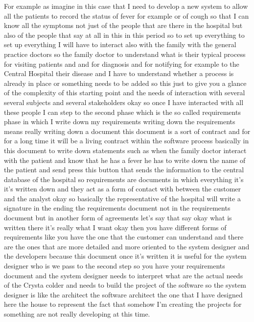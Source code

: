 \documentclass[conference, compsoc, twoside]{IEEEtran}
\begin{document}
For example as imagine in this case that I need to develop a new system to allow all the patients to record the status of fever 
for example or of cough so that I can know all the symptoms not just of the people that are there in the hospital but also of the people that say at all in this in this period so to set up everything to set up everything I will have to interact also with the family with the general practice doctors so the family doctor to understand what is their typical process for visiting patients and and for diagnosis and for notifying 
for example to the Central Hospital their disease and I have to understand whether a process is already in place or something needs to be added so this just to give you a glance of the complexity of this starting point and the needs of interaction with several several subjects and several stakeholders okay so once I have interacted with all these people I can step to the second phase which is the so called requirements phase in which I write down my requirements writing down the requirements means really writing down a document this document is a sort of contract and for for a long time it will be a living contract within the software process basically in this document to write down statements such as when the family doctor interact with the patient and know that he has a fever he has to write down the name of the patient and send press this button that sends the information to the central database of the hospital so requirements are documents in which everything it's it's written down and they act as a form of contact with between the customer and the analyst okay so basically the representative of the hospital will write a signature in the ending the requirements document not in the requirements document but in another form of agreements let's say that say okay what is written there it's really what I want okay then you have different forms of requirements like you have the one that the customer can understand and there are the ones that are more detailed and more oriented to the system designer and the developers because this document once it's written it is useful for the system designer who is we pass to the second step so you have your requirements document and the system designer needs to interpret what are the actual needs of the Crysta colder and needs to build the project of the software so the system designer is like the architect the software architect the one that I have designed here the house to represent the fact that somehow I'm creating the projects for something are not really developing at this time. 
\end{document}
